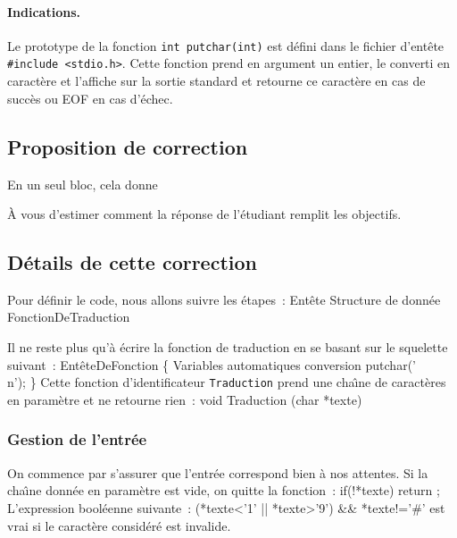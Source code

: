 \paragraph{Indications.}
Le prototype de la fonction \verb+int putchar(int)+ est d\'efini dans
le fichier d'ent\^ete \verb+#include <stdio.h>+. Cette fonction prend
en argument un entier, le converti en caract\`ere et l'affiche sur la
sortie standard et retourne ce caract\`ere en cas de succ\`es ou EOF
en cas d'\'echec.
\ifcorrection
\begin{correction}
\subsection*{Proposition de correction}%
En un seul bloc, cela donne

\`A vous d'estimer comment la r\'eponse de l'\'etudiant remplit les objectifs.
\subsection*{D\'etails de cette correction}%
Pour d\'efinir le code, nous allons suivre les \'etapes~:
\nwdocspar
\nwenddocs{}\moddef{*}\endmoddef
\LA{}Ent\^ete\RA{}
\LA{}Structure de donn\'ee\RA{}
\LA{}FonctionDeTraduction\RA{}
\nwendcode{}%

\nwenddocs{}\nwdocspar
Il ne reste plus qu'\`a \'ecrire la fonction de traduction en se basant
sur le squelette suivant~:
\nwenddocs{}\endmoddef
\LA{}Ent\^eteDeFonction\RA{}
\{
\LA{}Variables automatiques\RA{}
\LA{}conversion\RA{}
putchar('\\n');
\}
\eatline
\nwendcode{}\nwdocspar
\nwenddocs{}\nwdocspar
Cette fonction d'identificateur {\tt{}Traduction} prend une cha\^\i{}ne
de caract\`eres en param\`etre et ne retourne rien~:
\nwenddocs{}\endmoddef
void
Traduction
(char *texte)
\eatline
\nwendcode{}\nwdocspar
\subsubsection*{Gestion de l'entr\'ee}
On commence par s'assurer que l'entr\'ee correspond bien \`a nos attentes.
\nwenddocs{}\nwdocspar
Si la cha\^\i{}ne donn\'ee en param\`etre est vide, on quitte la fonction~:
\nwenddocs{}\endmoddef
if(!*texte)
   return ;
\eatline
\nwendcode{}\nwdocspar
\nwenddocs{}\nwdocspar
L'expression bool\'eenne suivante~:
\nwenddocs{}\endmoddef
(*texte<'1' || *texte>'9') && *texte!='#'
\eatline
\nwendcode{}est vrai si le caract\`ere consid\'er\'e est invalide.


\end{correction}
